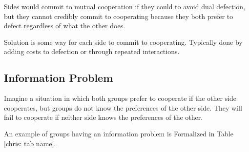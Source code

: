 \documentclass[11pt]{article}
\begin{document}
Sides would commit to mutual cooperation if they could to avoid dual
defection, but they cannot credibly commit to cooperating because they
both prefer to defect regardless of what the other does.

Solution is some way for each side to commit to cooperating. Typically
done by adding costs to defection or through repeated interactions.

\hypertarget{information-problem}{%
\subsection{Information Problem}\label{information-problem}}

Imagine a situation in which both groups prefer to cooperate if the
other side cooperates, but groups do not know the preferences of the
other side. They will fail to cooperate if neither side knows the
preferences of the other.

An example of groups having an information problem is Formalized in
Table {[}chris: tab name{]}.
\end{document}
